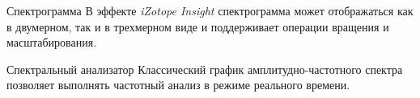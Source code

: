 \documentclass{beamer}
\begin{document}
\begin{frame}
\end{frame}

\begin{frame}{Спектрограмма} 
В эффекте \textit{iZotope Insight} спектрограмма может отображаться как в двумерном, так и в трехмерном виде и поддерживает операции вращения и масштабирования. 

\end{frame}

\begin{frame}
\end{frame}

\begin{frame}{Спектральный анализатор} 
Классический график амплитудно-частотного спектра позволяет выполнять частотный анализ в режиме реального времени. 

~

\end{frame}
\end{document}

